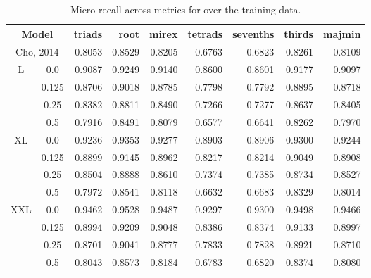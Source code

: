 \begin{table}[h]
\scriptsize
\begin{center}
\caption{Micro-recall across metrics for over the training data.}
\label{tab:recall_train}
\begin{tabular}{cc|rrrrrrr}

\hline
 \multicolumn{2}{c|}{Model} &   triads &   root &  mirex &   tetrads &   sevenths &   thirds &   majmin \\
\hline
\hline
\multicolumn{2}{c|}{Cho, 2014} &   0.8053 & 0.8529 &  0.8205 &    0.6763 &     0.6823 &   0.8261 &   0.8109 \\
\hline
 L &  0.0 & 0.9087 & 0.9249 &  0.9140 & 0.8600 & 0.8601 &   0.9177 &   0.9097 \\
 & 0.125 &   0.8706 & 0.9018 &  0.8785 &    0.7798 &     0.7792 &   0.8895 &   0.8718 \\
 &  0.25 &   0.8382 & 0.8811 &  0.8490 &    0.7266 &     0.7277 &   0.8637 &   0.8405 \\
 & 0.5 &   0.7916 & 0.8491 &  0.8079 &    0.6577 &     0.6641 &   0.8262 &   0.7970 \\
\hline
  XL &   0.0 &   0.9236 & 0.9353 &  0.9277 &    0.8903 &     0.8906 &   0.9300 &   0.9244 \\
   &  0.125 &   0.8899 & 0.9145 &  0.8962 &    0.8217 &     0.8214 &   0.9049 &   0.8908 \\
   &  0.25 &   0.8504 & 0.8888 &  0.8610 &    0.7374 &     0.7385 &   0.8734 &   0.8527 \\
   &  0.5 &   0.7972 & 0.8541 &  0.8118 &    0.6632 &     0.6683 &   0.8329 &   0.8014 \\
\hline
  XXL &  0.0 &   0.9462 & 0.9528 & 0.9487 &    0.9297 &     0.9300 &   0.9498 &   0.9466 \\
   &   0.125 &   0.8994 & 0.9209 &  0.9048 &    0.8386 &     0.8374 &   0.9133 &   0.8997 \\
   &   0.25 &   0.8701 & 0.9041 & 0.8777 &    0.7833 &     0.7828 &   0.8921 &   0.8710 \\
   &   0.5 &   0.8043 & 0.8573 &  0.8184 &    0.6783 &     0.6820 &   0.8374 &   0.8080 \\
\hline
\end{tabular}
\end{center}
\end{table}

